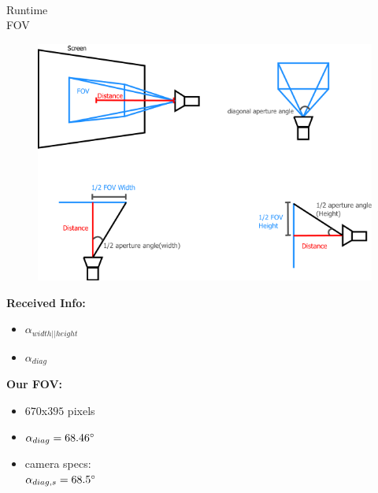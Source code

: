\documentclass[accentcolor=tud4b,colorbacktitle,inverttitle,landscape,german,presentation,t]{tudbeamer}
\begin{document}
\begin{frame}{\\Runtime\\ \small{FOV}}
\begin{figure}
\vspace{-0.5cm}
\hspace{2cm}
\includegraphics[scale=0.35]{distanceandangles}
\end{figure}
\vspace{-5.5cm}
\textbf{Received Info:}
\begin{itemize}
\item $\alpha_{width||height}$
\item $\alpha_{diag}$
\end{itemize}
\vspace{1cm}
\textbf{Our FOV:}
\begin{itemize}
\item $670$x$395$ pixels
\item $\alpha_{diag} = 68.46\degree$
\item camera specs:\\$\alpha_{diag,s} = 68.5\degree$
\end{itemize}
\end{frame}


\end{document}
